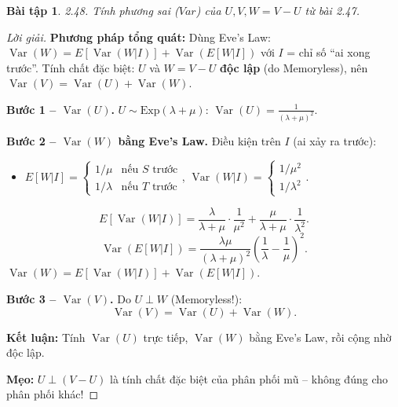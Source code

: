 \documentclass[8pt,a4paper]{article}
\newtheorem{exercise}{Bài tập}
\newenvironment{solution}{\begin{proof}[Lời giải]}{\end{proof}}
\newcommand{\Var}{\operatorname{Var}}
\begin{document}
\begin{exercise}
2.48. Tính phương sai ($Var$) của $U, V, W = V-U$ từ bài 2.47.
\end{exercise}
\begin{solution}
\textbf{Phương pháp tổng quát:} Dùng Eve's Law: $\Var(W) = E[\Var(W|I)] + \Var(E[W|I])$ với $I$ = chỉ số ``ai xong trước''. Tính chất đặc biệt: $U$ và $W = V-U$ \textbf{độc lập} (do Memoryless), nên $\Var(V) = \Var(U) + \Var(W)$.

\textbf{Bước 1 -- $\Var(U)$.} $U \sim \text{Exp}(\lambda+\mu)$: $\boxed{\Var(U) = \frac{1}{(\lambda+\mu)^2}}$.

\textbf{Bước 2 -- $\Var(W)$ bằng Eve's Law.} Điều kiện trên $I$ (ai xảy ra trước):
\begin{itemize}[nosep]
  \item $E[W|I] = \begin{cases} 1/\mu & \text{nếu } S \text{ trước} \\ 1/\lambda & \text{nếu } T \text{ trước} \end{cases}$, $\Var(W|I) = \begin{cases} 1/\mu^2 \\ 1/\lambda^2 \end{cases}$.
\end{itemize}
\[
  E[\Var(W|I)] = \frac{\lambda}{\lambda+\mu} \cdot \frac{1}{\mu^2} + \frac{\mu}{\lambda+\mu} \cdot \frac{1}{\lambda^2}.
\]
\[
  \Var(E[W|I]) = \frac{\lambda\mu}{(\lambda+\mu)^2}\left(\frac{1}{\lambda} - \frac{1}{\mu}\right)^2.
\]
$\Var(W) = E[\Var(W|I)] + \Var(E[W|I])$.

\textbf{Bước 3 -- $\Var(V)$.} Do $U \perp W$ (Memoryless!):
\[
  \boxed{\Var(V) = \Var(U) + \Var(W)}.
\]

\textbf{Kết luận:} Tính $\Var(U)$ trực tiếp, $\Var(W)$ bằng Eve's Law, rồi cộng nhờ độc lập.

\textbf{Mẹo:} $U \perp (V-U)$ là tính chất đặc biệt của phân phối mũ -- không đúng cho phân phối khác!
\end{solution}
\end{document}
